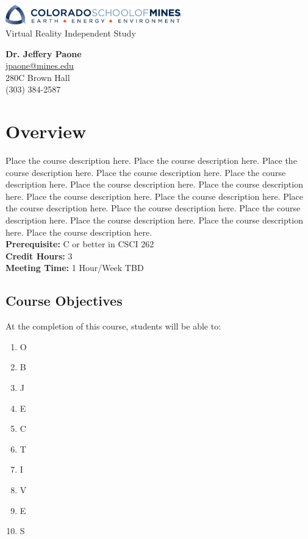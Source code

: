 \documentclass[11pt]{article}
\begin{document}
\begin{center}
    \includegraphics[width=3in]{logo-mines.png}
    \vspace{10mm}\\
    \LARGE Virtual Reality Independent Study
    \vspace{10mm}
\end{center}

\textbf{Dr. Jeffery Paone} \\
\url{jpaone@mines.edu} \\
280C Brown Hall \\
(303) 384-2587

\section{Overview}

Place the course description here. Place the course description here. Place the
course description here. Place the course description here. Place the course
description here. Place the course description here. Place the course
description here. Place the course description here. Place the course
description here. Place the course description here. Place the course
description here. Place the course description here. Place the course
description here. Place the course description here. Place the course
description here. \\

\textbf{Prerequisite:} C or better in CSCI 262 \\
\textbf{Credit Hours:} 3 \\
\textbf{Meeting Time:} 1 Hour/Week TBD

\subsection{Course Objectives}
At the completion of this course, students will be able to:
\begin{enumerate} \itemsep-0.4em
    \item O
    \item B
    \item J
    \item E
    \item C
    \item T
    \item I
    \item V
    \item E
    \item S
\end{enumerate}
\end{document}

